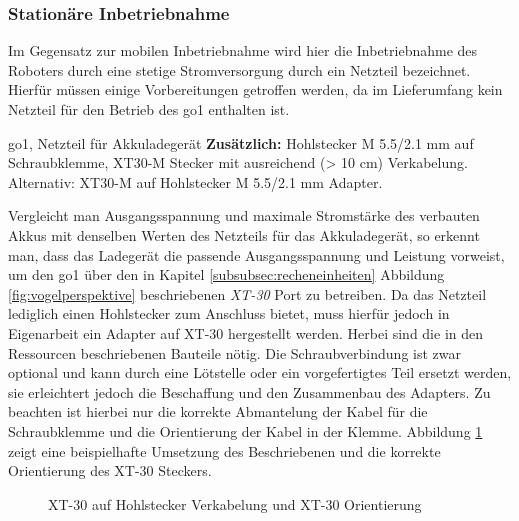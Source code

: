 \subsubsection{Stationäre Inbetriebnahme}
\label{subsubsec:inbetriebnahme_netzteil}

Im Gegensatz zur mobilen Inbetriebnahme wird hier die Inbetriebnahme des Roboters durch eine stetige Stromversorgung durch ein Netzteil
bezeichnet.
Hierfür müssen einige Vorbereitungen getroffen werden, da im Lieferumfang kein Netzteil für den Betrieb des \gls{go1}
enthalten ist.

\begin{requirements}
    \gls{go1}, Netzteil für Akkuladegerät\newline
    \textbf{Zusätzlich:} Hohlstecker M \num{5,5}/\num{2,1} mm auf Schraubklemme, XT30-M Stecker mit ausreichend (> \num{10} cm)
    Verkabelung.
    Alternativ: XT30-M auf Hohlstecker M \num{5,5}/\num{2,1} mm Adapter.
\end{requirements}

Vergleicht man Ausgangsspannung und maximale Stromstärke des verbauten Akkus mit denselben Werten des Netzteils für das
Akkuladegerät, so erkennt man, dass das Ladegerät die passende Ausgangsspannung und Leistung vorweist, um den \gls{go1}
über den in Kapitel \ref{subsubsec:recheneinheiten} Abbildung \ref{fig:vogelperspektive} beschriebenen \emph{XT-30} Port
zu betreiben.
Da das Netzteil lediglich einen Hohlstecker zum Anschluss bietet, muss hierfür jedoch in Eigenarbeit ein Adapter auf XT-30
hergestellt werden.
Herbei sind die in den Ressourcen beschriebenen Bauteile nötig.
Die Schraubverbindung ist zwar optional und kann durch eine
Lötstelle oder ein vorgefertigtes Teil ersetzt werden, sie erleichtert jedoch die Beschaffung und den Zusammenbau des Adapters.
Zu beachten ist hierbei nur die korrekte Abmantelung der Kabel für die Schraubklemme und die Orientierung der Kabel in der
Klemme.
Abbildung \ref{fig:xt30} zeigt eine beispielhafte Umsetzung des Beschriebenen und die korrekte Orientierung des XT-30 Steckers.

\begin{figure}[h]
    \caption{XT-30 auf Hohlstecker Verkabelung und XT-30 Orientierung}\label{fig:xt30}
\end{figure}

